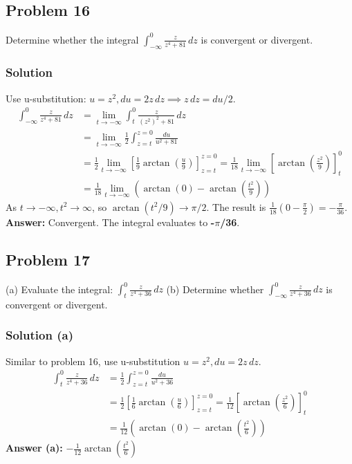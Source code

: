 \documentclass{article}
\begin{document}
\subsection{Problem 16}
Determine whether the integral $ \int_{-\infty}^{0} \frac{z}{z^4+81} \,dz $ is convergent or divergent.
\subsubsection*{Solution}
Use u-substitution: $ u = z^2, du = 2z \,dz \implies z\,dz = du/2 $.
\begin{align*}
    \int_{-\infty}^{0} \frac{z}{z^4+81} \,dz &= \lim_{t \to -\infty} \int_{t}^{0} \frac{z}{(z^2)^2+81} \,dz \\
    &= \lim_{t \to -\infty} \frac{1}{2} \int_{z=t}^{z=0} \frac{du}{u^2+81} \\
    &= \frac{1}{2} \lim_{t \to -\infty} \left[ \frac{1}{9}\arctan\left(\frac{u}{9}\right) \right]_{z=t}^{z=0} = \frac{1}{18} \lim_{t \to -\infty} \left[ \arctan\left(\frac{z^2}{9}\right) \right]_{t}^{0} \\
    &= \frac{1}{18} \lim_{t \to -\infty} \left( \arctan(0) - \arctan\left(\frac{t^2}{9}\right) \right)
\end{align*}
As $ t \to -\infty, t^2 \to \infty $, so $ \arctan(t^2/9) \to \pi/2 $.
The result is $ \frac{1}{18}(0 - \frac{\pi}{2}) = -\frac{\pi}{36} $.
\textbf{Answer:} Convergent. The integral evaluates to \textbf{-$\pi$/36}.

\subsection{Problem 17}
(a) Evaluate the integral: $ \int_{t}^{0} \frac{z}{z^4+36} \,dz $
(b) Determine whether $ \int_{-\infty}^{0} \frac{z}{z^4+36} \,dz $ is convergent or divergent.
\subsubsection*{Solution (a)}
Similar to problem 16, use u-substitution $ u=z^2, du=2z\,dz $.
\begin{align*}
    \int_{t}^{0} \frac{z}{z^4+36} \,dz &= \frac{1}{2} \int_{z=t}^{z=0} \frac{du}{u^2+36} \\
    &= \frac{1}{2} \left[ \frac{1}{6}\arctan\left(\frac{u}{6}\right) \right]_{z=t}^{z=0} = \frac{1}{12} \left[ \arctan\left(\frac{z^2}{6}\right) \right]_{t}^{0} \\
    &= \frac{1}{12} \left( \arctan(0) - \arctan\left(\frac{t^2}{6}\right) \right)
\end{align*}
\textbf{Answer (a):} $ -\frac{1}{12}\arctan\left(\frac{t^2}{6}\right) $
\end{document}
